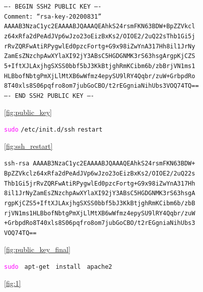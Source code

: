 \documentclass[11pt]{article}
\newcommand{\imagecaption}[1]{\vspace{-7pt}\caption*{\char91\ref{fig:#1}\char93}}
\newcommand{\codetext}[2]{\large\texttt{\textcolor{#1}{#2}}}
\begin{document}
		\begin{figure}[H]
			\centering
			\begin{code-box}
				\codetext{dark-gray}{---- BEGIN SSH2 PUBLIC KEY ----\\
				Comment: ``rsa-key-20200831''\\
				AAAAB3NzaC1yc2EAAAABJQAAAQEAhkS24rsmFKN63BDW+BpZZVkcl
				z64xRfa2dPeAdJVp6wJzo23oEizBxKs2/OIOE2/2uQ22sThb1Gi5j
				rRvZQRFwAtiRPygwlEd0pzcFortg+G9x98iZwYnA317Hh8il1JrNy
				ZamEsZNzchpAwXYlaXI92jY3ABsC5HGDGNMK3rS63hsgArgpKjCZS
				5+IftXJLAxjhgSXSS0bbf5bJ3KkBtjghRmKCibm6b/zbBrjVN1ms1
				HLBbofNbtgPmXjLlMtXB6wWfmz4epySU9lRY4Qqbr/zuW+GrbpdRo
				8T40xls8S06pqfro8om7jubGoCBO/t2rEGgniaNihUbs3VOQ74TQ==\\
				---- END SSH2 PUBLIC KEY ----}
			\end{code-box}
			\imagecaption{public_key}
		\end{figure}
		
		\begin{figure}[H]
			\centering
			\begin{code-box}
				\codetext{fuchsia}{sudo} \codetext{light-blue}{/etc/init.d/ssh} \codetext{light-orange}{restart}
			\end{code-box}
			\imagecaption{ssh_restart}
		\end{figure}
		
		\begin{figure}[H]
			\centering
			\begin{code-box}
				\codetext{dark-gray}{ssh-rsa AAAAB3NzaC1yc2EAAAABJQAAAQEAhkS24rsmFKN63BDW+
				BpZZVkclz64xRfa2dPeAdJVp6wJzo23oEizBxKs2/OIOE2/2uQ22s
				Thb1Gi5jrRvZQRFwAtiRPygwlEd0pzcFortg+G9x98iZwYnA317Hh
				8il1JrNyZamEsZNzchpAwXYlaXI92jY3ABsC5HGDGNMK3rS63hsgA
				rgpKjCZS5+IftXJLAxjhgSXSS0bbf5bJ3KkBtjghRmKCibm6b/zbB
				rjVN1ms1HLBbofNbtgPmXjLlMtXB6wWfmz4epySU9lRY4Qqbr/zuW
				+GrbpdRo8T40xls8S06pqfro8om7jubGoCBO/t2rEGgniaNihUbs3
				VOQ74TQ==}
			\end{code-box}
			\imagecaption{public_key_final}
		\end{figure}
		
		\begin{figure}[H]
			\centering
			\begin{code-box}
				\codetext{fuchsia}{sudo } \codetext{light-blue}{apt-get } \codetext{light-orange}{install } \codetext{dark-gray}{apache2}
			\end{code-box}
			\imagecaption{1}
		\end{figure}
		
\end{document}
